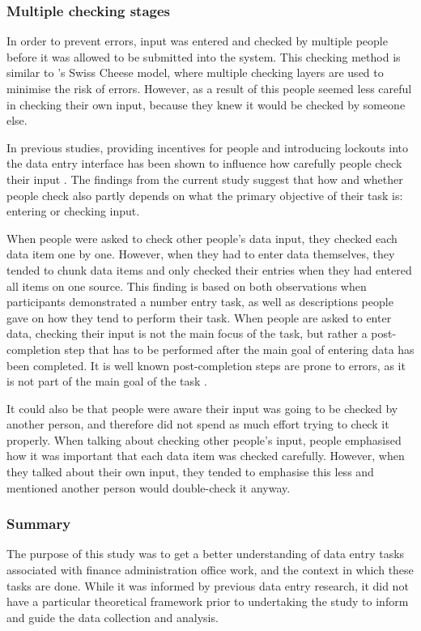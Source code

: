 \documentclass[11pt,oneside]{report}
\begin{document}
\subsubsection{Multiple checking stages}
In order to prevent errors, input was entered and checked by multiple people before it was allowed to be submitted into the system. This checking method is similar to \citeauthor{Reason1990}'s \citeyearpar{Reason1990}  Swiss Cheese model, where multiple checking layers are used to minimise the risk of errors. However, as a result of this people seemed less careful in checking their own input, because they knew it would be checked by someone else. 

In previous studies, providing incentives for people and introducing lockouts into the data entry interface has been shown to influence how carefully people check their input \citep{LiSimon2015, Gould2015}. The findings from the current study suggest that how and whether people check also partly depends on what the primary objective of their task is: entering or checking input.

When people were asked to check other people's data input, they checked each data item one by one. However, when they had to enter data themselves, they tended to chunk data items and only checked their entries when they had entered all items on one source. This finding is based on both observations when participants demonstrated a number entry task, as well as descriptions people gave on how they tend to perform their task. When people are asked to enter data, checking their input is not the main focus of the task, but rather a post-completion step that has to be performed after the main goal of entering data has been completed. It is well known post-completion steps are prone to errors, as it is not part of the main goal of the task \citep[e.g.][]{Byrne1995, Li2006, Li2008}.

It could also be that people were aware their input was going to be checked by another person, and therefore did not spend as much effort trying to check it properly. When talking about checking other people's input, people emphasised how it was important that each data item was checked carefully. However, when they talked about their own input, they tended to emphasise this less and mentioned another person would double-check it anyway.

\subsubsection{Summary}
The purpose of this study was to get a better understanding of data entry tasks associated with finance administration office work, and the context in which these tasks are done. While it was informed by previous data entry research, it did not have a particular theoretical framework prior to undertaking the study to inform and guide the data collection and analysis. 
\end{document}
